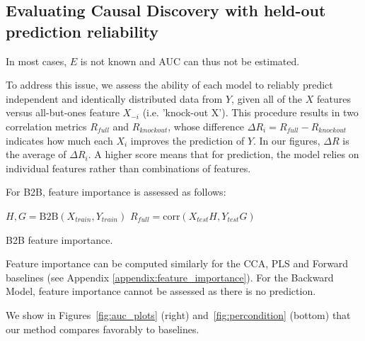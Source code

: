 \subsection{Evaluating Causal Discovery with held-out prediction reliability}

In most cases, $E$ is not known and AUC can thus not be estimated.

To address this issue, we assess the ability of each model to reliably predict
independent and identically distributed data from $Y$, given all of the $X$
features versus all-but-ones feature $X_{-i}$ (i.e. 'knock-out X'). This procedure
results in two correlation metrics $R_{full}$ and $R_{knockout}$, whose
difference $\Delta R_i = R_{full}-R_{knockout}$ indicates how much each $X_i$
improves the prediction of $Y$.
In our figures, $\Delta R$ is the average of $\Delta R_i$. A higher score means that for prediction, the model relies on individual features rather than combinations of features.

For B2B, feature importance is assessed as follows:

\begin{algorithm}[H]
      $H, G = \text{B2B}(X_{train}, Y_{train})$\;
$R_{full} = \text{corr}(X_{test} H, Y_{test} G)$\;

 \caption{B2B feature importance.} \label{algorithm:b2b_fi}
\end{algorithm}

Feature importance can be computed similarly for the CCA, PLS and Forward baselines (see Appendix \ref{appendix:feature_importance}). For the Backward Model, feature importance cannot be assessed as there is no prediction.

We show in Figures~\ref{fig:auc_plots} (right) and~\ref{fig:percondition} (bottom) that our method compares favorably to baselines.

%

